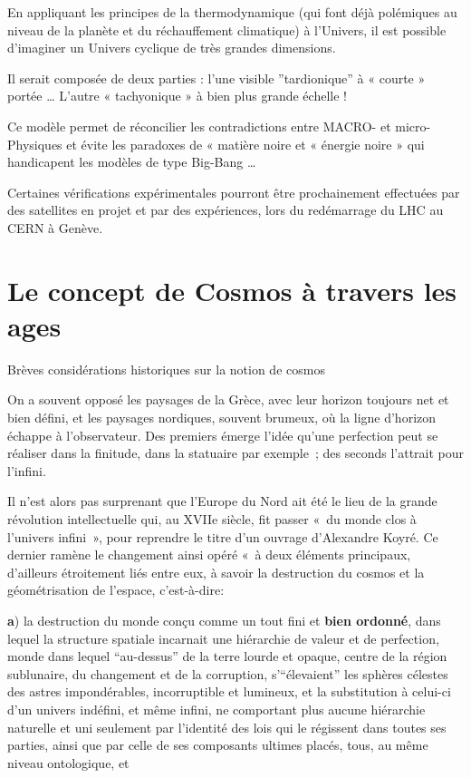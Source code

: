 \documentclass[a4paper,12pt]{article}
\begin{document}
En appliquant les principes de la thermodynamique (qui font déjà polémiques au niveau de la planète et du réchauffement climatique) à l'Univers, il est possible d'imaginer un Univers cyclique de très grandes dimensions.

Il serait composée de deux parties : l'une visible ”tardionique” à « courte » portée … L'autre « tachyonique » à bien plus grande échelle !

Ce modèle permet de réconcilier les contradictions entre MACRO- et micro- Physiques et évite les paradoxes de « matière noire et « énergie noire » qui handicapent les modèles de type Big-Bang …

Certaines vérifications expérimentales pourront être prochainement effectuées par des satellites en projet et par des expériences, lors du redémarrage du LHC au CERN à Genève.


\section{Le concept de Cosmos à travers les ages}

Brèves considérations historiques sur la notion de cosmos

On a souvent opposé les paysages de la Grèce, avec leur horizon toujours net et bien défini, et les paysages nordiques, souvent brumeux, où la ligne d'horizon échappe à l'observateur. Des premiers émerge l'idée qu'une perfection peut se réaliser dans la finitude, dans la statuaire par exemple ; des seconds l'attrait pour l'infini. 

Il n'est alors pas surprenant que l'Europe du Nord ait été le lieu de la grande révolution intellectuelle qui, au XVIIe siècle, fit passer « du monde clos à l'univers infini », pour reprendre le titre d'un ouvrage d'Alexandre Koyré. Ce dernier ramène le changement ainsi opéré « à deux éléments principaux, d'ailleurs étroitement liés entre eux, à savoir la destruction du cosmos et la géométrisation de l'espace, c'est-à-dire:

\textbf{a}) la destruction du monde conçu comme un tout fini et  \textbf{bien ordonné}, dans lequel la structure spatiale incarnait une hiérarchie de valeur et de perfection, monde dans lequel “au-dessus” de la terre lourde et opaque, centre de la région sublunaire, du changement et de la corruption, s'“élevaient” les sphères célestes des astres impondérables, incorruptible et lumineux, et la substitution à celui-ci d'un univers indéfini, et même infini, ne comportant plus aucune hiérarchie naturelle et uni seulement par l'identité des lois qui le régissent dans toutes ses parties, ainsi que par celle de ses composants ultimes placés, tous, au même niveau ontologique, et 
\end{document}
